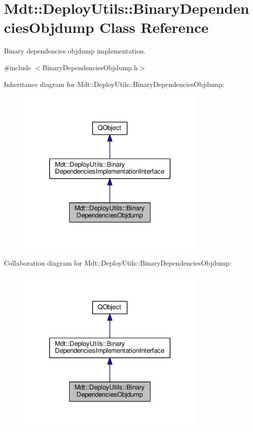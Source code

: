 \hypertarget{class_mdt_1_1_deploy_utils_1_1_binary_dependencies_objdump}{}\section{Mdt\+:\+:Deploy\+Utils\+:\+:Binary\+Dependencies\+Objdump Class Reference}
\label{class_mdt_1_1_deploy_utils_1_1_binary_dependencies_objdump}


Binary dependencies objdump implementation.  




{\ttfamily \#include $<$Binary\+Dependencies\+Objdump.\+h$>$}



Inheritance diagram for Mdt\+:\+:Deploy\+Utils\+:\+:Binary\+Dependencies\+Objdump\+:
\nopagebreak
\begin{figure}[H]
\begin{center}
\leavevmode
\includegraphics[width=264pt]{class_mdt_1_1_deploy_utils_1_1_binary_dependencies_objdump__inherit__graph}
\end{center}
\end{figure}


Collaboration diagram for Mdt\+:\+:Deploy\+Utils\+:\+:Binary\+Dependencies\+Objdump\+:
\nopagebreak
\begin{figure}[H]
\begin{center}
\leavevmode
\includegraphics[width=264pt]{class_mdt_1_1_deploy_utils_1_1_binary_dependencies_objdump__coll__graph}
\end{center}
\end{figure}
